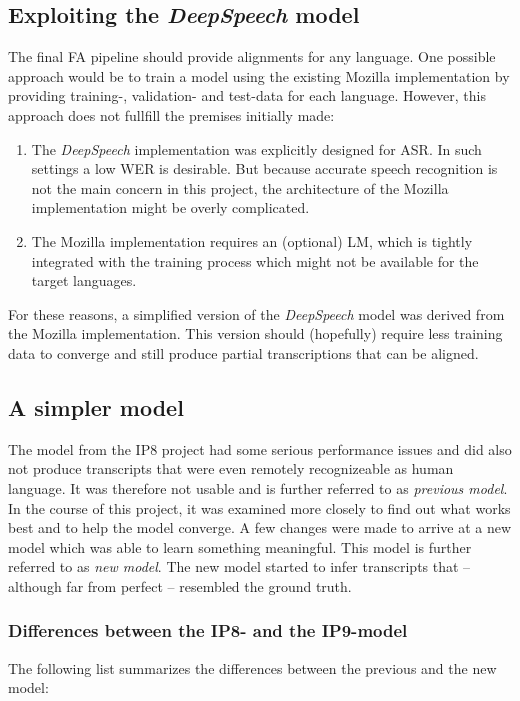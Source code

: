 \subsection{Exploiting the \textit{DeepSpeech} model}

The final \ac{FA} pipeline should provide alignments for any language. One possible approach would be to train a model using the existing Mozilla implementation by providing training-, validation- and test-data for each language. However, this approach does not fullfill the premises initially made:

\begin{enumerate}
	\item The \textit{DeepSpeech} implementation was explicitly designed for \ac{ASR}. In such settings a low \ac{WER} is desirable. But because accurate speech recognition is not the main concern in this project, the architecture of the Mozilla implementation might be overly complicated.
	\item The Mozilla implementation requires an (optional) \ac{LM}, which is tightly integrated with the training process which might not be available for the target languages.
\end{enumerate}

For these reasons, a simplified version of the \textit{DeepSpeech} model was derived from the Mozilla implementation. This version should (hopefully) require less training data to converge and still produce partial transcriptions that can be aligned.

\subsection{A simpler model}

The model from the IP8 project had some serious performance issues and did also not produce transcripts that were even remotely recognizeable as human language. It was therefore not usable and is further referred to as \textit{previous model}. In the course of this project, it was examined more closely to find out what works best and to help the model converge. A few changes were made to arrive at a new model which was able to learn something meaningful. This model is further referred to as \textit{new model}. The new model started to infer transcripts that -- although far from perfect -- resembled the ground truth. 

\subsubsection{Differences between the IP8- and the IP9-model}
The following list summarizes the differences between the previous and the new model:

